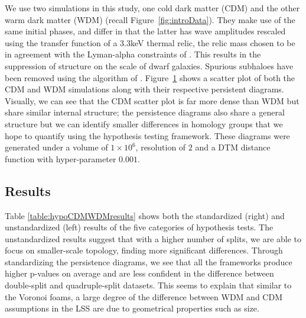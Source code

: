 \documentclass[12pt]{article}
\newcommand{\figref}[1]{Figure~\ref{#1}}
\begin{document}
\begin{figure}[htp!]
  \label{fig:eagleDiags}
\end{figure}

We use two simulations in this study, one cold dark matter (CDM) and the other warm dark matter (WDM) (recall \figref{fig:introData}). They make use of the same initial phases, and differ in that the latter has wave amplitudes rescaled using the transfer function of a 3.3keV thermal relic, the relic mass chosen to be in agreement with the Lyman-alpha constraints of \citep{viel2013warm}. This results in the suppression of structure on the scale of dwarf galaxies. Spurious subhaloes have been removed using the algorithm of \citep{lovell2014properties}. \figref{fig:eagleDiags} shows a scatter plot of both the CDM and WDM simulations along with their respective persistent diagrams. Visually, we can see that the CDM scatter plot is far more dense than WDM but share similar internal structure; the persistence diagrams also share a general structure but we can identify smaller differences in homology groups that we hope to quantify using the hypothesis testing framework. These diagrams were generated under a volume of $1\times 10^{6}$, resolution of $2$ and a DTM distance function with hyper-parameter $0.001$. 

\subsection{Results}
Table \ref{table:hypoCDMWDMresults} shows both the standardized (right) and unstandardized (left) results of the five categories of hypothesis tests. The unstandardized results suggest that with a higher number of splits, we are able to focus on smaller-scale topology, finding more significant differences. Through standardizing the persistence diagrams, we see that all the frameworks produce higher p-values on average and are less confident in the difference between double-split and quadruple-split datasets. This seems to explain that similar to the Voronoi foams, a large degree of the difference between WDM and CDM assumptions in the LSS are due to geometrical properties such as size.  
\end{document}
